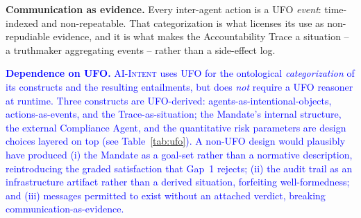 \documentclass[runningheads]{llncs}
\begin{document}
\textbf{Communication as evidence.} Every inter-agent action is a UFO \emph{event}: time-indexed and non-repeatable. That categorization is what licenses its use as non-repudiable evidence, and it is what makes the Accountability Trace a situation -- a truthmaker aggregating events -- rather than a side-effect log.

\textcolor{blue}{\textbf{Dependence on UFO.} \textsc{AI-Intent} uses UFO for the ontological \emph{categorization} of its constructs and the resulting entailments, but does \emph{not} require a UFO reasoner at runtime. Three constructs are UFO-derived: agents-as-intentional-objects, actions-as-events, and the Trace-as-situation; the Mandate's internal structure, the external Compliance Agent, and the quantitative risk parameters are design choices layered on top (see Table~\ref{tab:ufo}). A non-UFO design would plausibly have produced (i) the Mandate as a goal-set rather than a normative description, reintroducing the graded satisfaction that Gap~1 rejects; (ii) the audit trail as an infrastructure artifact rather than a derived situation, forfeiting well-formedness; and (iii) messages permitted to exist without an attached verdict, breaking communication-as-evidence. } 
\end{document}
